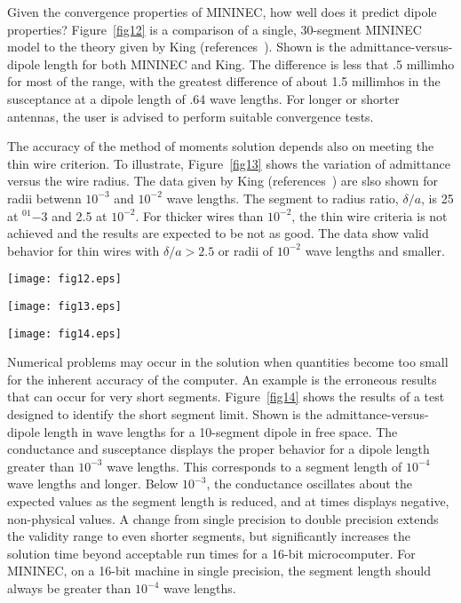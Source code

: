 \documentclass[12pt]{article}
\begin{document}
Given the convergence properties of MININEC, how well does it predict
dipole properties? Figure~\ref{fig12} is a comparison of a single,
30-segment MININEC model to the theory given by King
(references~\cite{r9}). Shown is the admittance-versus-dipole length for
both MININEC and King. The difference is less that .5 millimho for most
of the range, with the greatest difference of about 1.5 millimhos in the
susceptance at a dipole length of .64 wave lengths. For longer or
shorter antennas, the user is advised to perform suitable convergence
tests.

The accuracy of the method of moments solution depends also on meeting
the thin wire criterion. To illustrate, Figure~\ref{fig13} shows the
variation of admittance versus the wire radius. The data given by King
(references~\cite{r9}) are slso shown for radii betwenn $10^{-3}$ and
$10^{-2}$ wave lengths. The segment to radius ratio, $\delta/a$, is 25
at $^01{-3}$ and 2.5 at $10^{-2}$. For thicker wires than $10^{-2}$, the
thin wire criteria is not achieved and the results are expected to be
not as good. The data show valid behavior for thin wires with
$\delta/a > 2.5$ or radii of $10^{-2}$ wave lengths and smaller.

\begin{sidewaysfigure}[htb]
\centerline{\texttt{[image: fig12.eps]}}
\caption{Dipole admittance predicted by MININEC (compared to the theory of
R. W. P. King \cite{r8},~\cite{r9})}
\label{fig12}
\end{sidewaysfigure}

\begin{sidewaysfigure}[htb]
\centerline{\texttt{[image: fig13.eps]}}
\caption{[Dipole admittance vs. Wire Radius] (compared to the theory of
R. W. P. King \cite{r8},~\cite{r9})}
\label{fig13}
\end{sidewaysfigure}

\begin{sidewaysfigure}[htb]
\centerline{\texttt{[image: fig14.eps]}}
\caption{[Admittance vs. Dipole length] predicted by MININEC}
\label{fig14}
\end{sidewaysfigure}
\afterpage\clearpage

Numerical problems may occur in the solution when quantities become too
small for the inherent accuracy of the computer. An example is the
erroneous results that can occur for very short segments.
Figure~\ref{fig14} shows the results of a test designed to identify the
short segment limit. Shown is the admittance-versus-dipole length in wave
lengths for a 10-segment dipole in free space. The conductance and
susceptance displays the proper behavior for a dipole length greater
than $10^{-3}$ wave lengths. This corresponds to a segment length of
$10^{-4}$ wave lengths and longer. Below $10^{-3}$, the conductance
oscillates about the expected values as the segment length is reduced,
and at times displays negative, non-physical values. A change from
single precision to double precision extends the validity range to even
shorter segments, but significantly increases the solution time beyond
acceptable run times for a 16-bit microcomputer. For MININEC, on a
16-bit machine in single precision, the segment length should always be
greater than $10^{-4}$ wave lengths.
\end{document}
